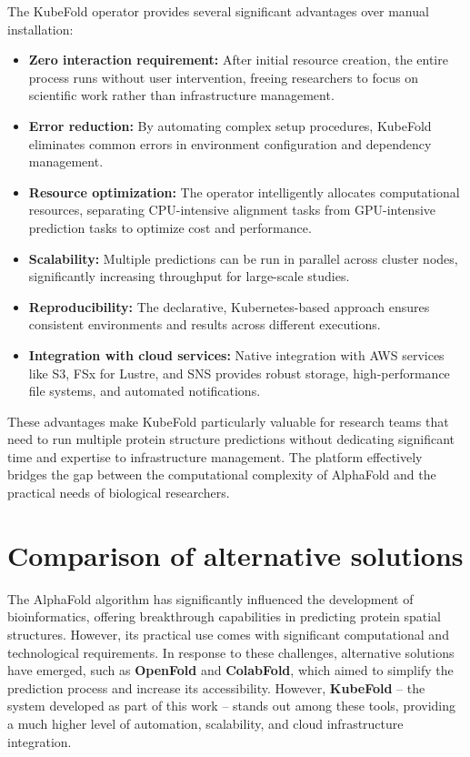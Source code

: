 The KubeFold operator provides several significant advantages over manual installation:

\begin{itemize}
    \item \textbf{Zero interaction requirement:} After initial resource creation, the entire process runs without user intervention, freeing researchers to focus on scientific work rather than infrastructure management.
    
    \item \textbf{Error reduction:} By automating complex setup procedures, KubeFold eliminates common errors in environment configuration and dependency management.
    
    \item \textbf{Resource optimization:} The operator intelligently allocates computational resources, separating CPU-intensive alignment tasks from GPU-intensive prediction tasks to optimize cost and performance.
    
    \item \textbf{Scalability:} Multiple predictions can be run in parallel across cluster nodes, significantly increasing throughput for large-scale studies.
    
    \item \textbf{Reproducibility:} The declarative, Kubernetes-based approach ensures consistent environments and results across different executions.
    
    \item \textbf{Integration with cloud services:} Native integration with AWS services like S3, FSx for Lustre, and SNS provides robust storage, high-performance file systems, and automated notifications.
\end{itemize}

These advantages make KubeFold particularly valuable for research teams that need to run multiple protein structure predictions without dedicating significant time and expertise to infrastructure management. The platform effectively bridges the gap between the computational complexity of AlphaFold and the practical needs of biological researchers.

\section{Comparison of alternative solutions}

The AlphaFold algorithm has significantly influenced the development of bioinformatics, offering breakthrough capabilities in predicting protein spatial structures.
However, its practical use comes with significant computational and technological requirements.
In response to these challenges, alternative solutions have emerged, such as \textbf{OpenFold}\cite{openfold} and \textbf{ColabFold}\cite{colabfold}, which aimed to simplify the prediction process and increase its accessibility.
However, \textbf{KubeFold} – the system developed as part of this work – stands out among these tools, providing a much higher level of automation, scalability, and cloud infrastructure integration.

